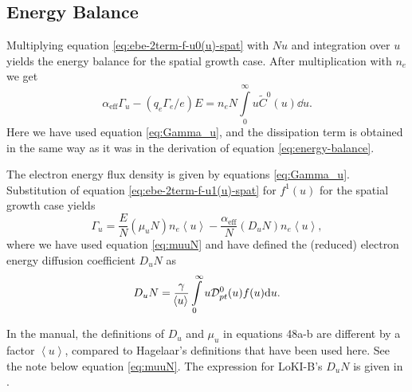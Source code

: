 \documentclass{book}
\newcommand{\MEAN}[1]{\ensuremath{\!\left\langle{{#1}}\right\rangle}}
\begin{document}
\subsection{Energy Balance}

Multiplying equation \eqref{eq:ebe-2term-f-u0(u)-spat} with $Nu$ and integration over $u$
yields the energy balance for the spatial growth case. After multiplication with $n_e$
we get
\begin{equation}
	\alpha_{\text{eff}}\Gamma_u -(q_e\Gamma_e/e) E = n_eN\int\limits_0^\infty u \tilde{C}^0(u)\dd{u}.
\end{equation}
Here we have used equation \eqref{eq:Gamma_u}, and the dissipation term is obtained in the
same way as it was in the derivation of equation \eqref{eq:energy-balance}.

The electron energy flux density is given by equations \eqref{eq:Gamma_u}. Substitution
of equation \eqref{eq:ebe-2term-f-u1(u)-spat} for $f^1(u)$ for the spatial growth case yields
\begin{equation}
	\Gamma_u = \frac{E}{N}(\mu_u N)n_e\MEAN{u} - \frac{\alpha_{\text{eff}}}{N}(D_uN)n_e\MEAN{u},
	\label{eq:Gamma_u-sst}
\end{equation}
where we have used equation \eqref{eq:muuN} and have defined the (reduced) electron energy diffusion
coefficient $D_uN$ as
\begin{equation}
	D_uN = \frac{\gamma}{\MEAN{u}}\int\limits_0^\infty u{\cal D}_{pt}^0(u)f(u)\dd{u}.
	\label{eq:DuN}
\end{equation}
\begin{framed}
In the manual, the definitions of $D_u$ and $\mu_u$ in equations 48a-b are different
by a factor $\MEAN{u}$, compared to Hagelaar's definitions \cite[eq. 61,62]{Hagelaar2005}
that have been used here.  See the note below equation \eqref{eq:muuN}.
The expression for LoKI-B's $D_uN$ is given in \cite[eq. 48a]{Manual_2_2_0}.
\end{framed}
\end{document}
